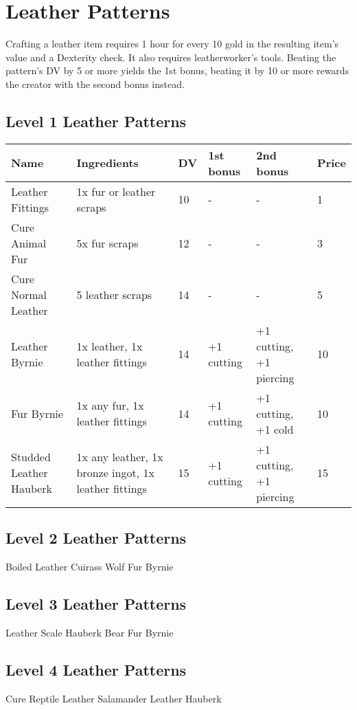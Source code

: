\section{Leather Patterns}
Crafting a leather item requires 1 hour for every 10 gold in the resulting item's value and a Dexterity check. It also requires leatherworker's tools. Beating the pattern's DV by 5 or more yields the 1st bonus, beating it by 10 or more rewards the creator with the second bonus instead.\\

\subsection{Level 1 Leather Patterns}
\begin{longtable}{p{1.5cm} | p{2.5cm} | l | p{2cm} | p{2cm} | p{1cm} }
	Name & Ingredients & DV  & 1st bonus & 2nd bonus & Price\\ \hline
	Leather Fittings & 1x fur or leather scraps & 10 & - & - & 1\\
	Cure Animal Fur & 5x fur scraps & 12 & - & - & 3\\
	Cure Normal Leather & 5 leather scraps & 14 & - & - & 5\\
	Leather Byrnie & 1x leather, 1x leather fittings & 14 & +1 cutting & +1 cutting, +1 piercing & 10\\
	Fur Byrnie & 1x any fur, 1x leather fittings & 14 & +1 cutting & +1 cutting, +1 cold & 10\\
	Studded Leather Hauberk & 1x any leather, 1x bronze ingot, 1x leather fittings & 15 & +1 cutting & +1 cutting, +1 piercing & 15\\
\end{longtable}

\subsection{Level 2 Leather Patterns}
Boiled Leather Cuirass
Wolf Fur Byrnie

\subsection{Level 3 Leather Patterns}
Leather Scale Hauberk
Bear Fur Byrnie

\subsection{Level 4 Leather Patterns}
Cure Reptile Leather
Salamander Leather Hauberk

